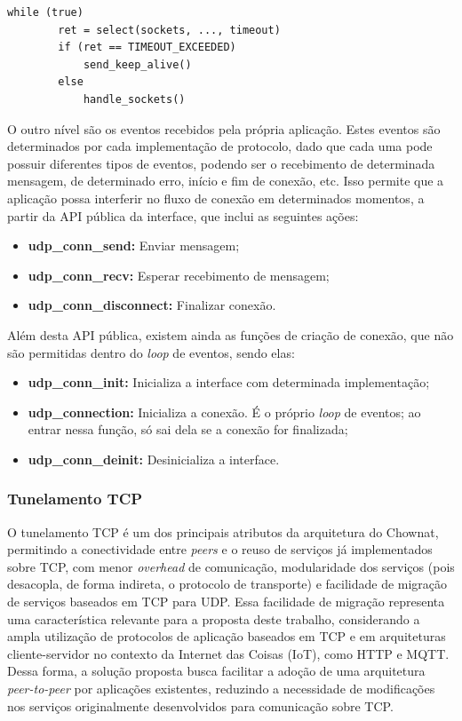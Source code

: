 \begin{lstlisting}[caption={Pseudocódigo do loop de eventos da interface}, label={lst:select_pseudocode}]
    while (true)
        ret = select(sockets, ..., timeout)
        if (ret == TIMEOUT_EXCEEDED)
            send_keep_alive()
        else
            handle_sockets()
\end{lstlisting}

O outro nível são os eventos recebidos pela própria aplicação. Estes eventos são determinados por cada implementação de protocolo, dado que cada uma pode possuir diferentes tipos de eventos, podendo ser o recebimento de determinada mensagem, de determinado erro, início e fim de conexão, etc. Isso permite que a aplicação possa interferir no fluxo de conexão em determinados momentos, a partir da API pública da interface, que inclui as seguintes ações:

\begin{itemize}
    \item \textbf{udp\_conn\_send:} Enviar mensagem;
    \item \textbf{udp\_conn\_recv:} Esperar recebimento de mensagem;
    \item \textbf{udp\_conn\_disconnect:} Finalizar conexão.
\end{itemize}

Além desta API pública, existem ainda as funções de criação de conexão, que não são permitidas dentro do \textit{loop} de eventos, sendo elas:

\begin{itemize}
    \item \textbf{udp\_conn\_init:} Inicializa a interface com determinada implementação;
    \item \textbf{udp\_connection:} Inicializa a conexão. É o próprio \textit{loop} de eventos; ao entrar nessa função, só sai dela se a conexão for finalizada;
    \item \textbf{udp\_conn\_deinit:} Desinicializa a interface.
\end{itemize}

\subsubsection{Tunelamento TCP}

O tunelamento TCP é um dos principais atributos da arquitetura do Chownat, permitindo a conectividade entre \textit{peers} e o reuso de serviços já implementados sobre TCP, com menor \textit{overhead} de comunicação, modularidade dos serviços (pois desacopla, de forma indireta, o protocolo de transporte) e facilidade de migração de serviços baseados em TCP para UDP. Essa facilidade de migração representa uma característica relevante para a proposta deste trabalho, considerando a ampla utilização de protocolos de aplicação baseados em TCP e em arquiteturas cliente-servidor no contexto da Internet das Coisas (IoT), como HTTP e MQTT. Dessa forma, a solução proposta busca facilitar a adoção de uma arquitetura \textit{peer-to-peer} por aplicações existentes, reduzindo a necessidade de modificações nos serviços originalmente desenvolvidos para comunicação sobre TCP.

